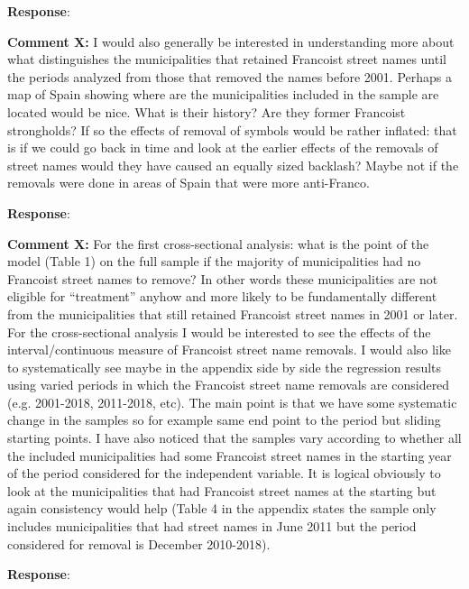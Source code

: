 \documentclass[12pt, a4paper, notitlepage]{article}
\begin{document}
\textbf{Response}: {\color{red}{pending}}

\textbf{Comment X:} I would also generally be interested in understanding more about what distinguishes the municipalities that retained Francoist street names until the periods analyzed from those that removed the names before 2001. Perhaps a map of Spain showing where are the municipalities included in the sample are located would be nice. What is their history? Are they former Francoist strongholds? If so the effects of removal of symbols would be rather inflated: that is if we could go back in time and look at the earlier effects of the removals of street names would they have caused an equally sized backlash? Maybe not if the removals were done in areas of Spain that were more anti-Franco. 

\textbf{Response}: {\color{red}{pending}}

\textbf{Comment X:} For the first cross-sectional analysis: what is the point of the model (Table 1) on the full sample if the majority of municipalities had no Francoist street names to remove? In other words these municipalities are not eligible for “treatment” anyhow and more likely to be fundamentally different from the municipalities that still retained Francoist street names in 2001 or later. For the cross-sectional analysis I would be interested to see the effects of the interval/continuous measure of Francoist street name removals. I would also like to systematically see maybe in the appendix side by side the regression results using varied periods in which the Francoist street name removals are considered (e.g. 2001-2018, 2011-2018, etc). The main point is that we have some systematic change in the samples so for example same end point to the period but sliding starting points. I have also noticed that the samples vary according to whether all the included municipalities had some Francoist street names in the starting year of the period considered for the independent variable. It is logical obviously to look at the municipalities that had Francoist street names at the starting but again consistency would help (Table 4 in the appendix states the sample only includes municipalities that had street names in June 2011 but the period considered for removal is December 2010-2018).

\textbf{Response}: {\color{red}{pending}}
\end{document}

